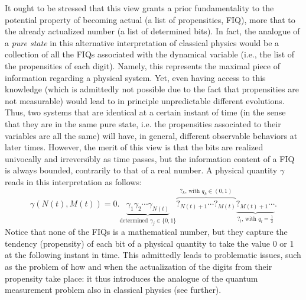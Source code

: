 \documentclass[aps,prl,twocolumn,showpacs,superscriptaddress,groupedaddress, nofootinbib]{revtex4-1}
\begin{document}
It ought to be stressed that this view grants a prior fundamentality to the potential property of becoming actual (a list of propensities, FIQ), more that to the already actualized number (a list of determined bits). {In fact, the analogue of a \emph{pure state} in this alternative interpretation of classical physics would be a collection of all the FIQs associated with the dynamical variable (i.e., the list of the propensities of each digit). Namely, this represents the maximal piece of information regarding a physical system. Yet, even having access to this knowledge (which is admittedly not possible due to the fact that propensities are not measurable) would lead to in principle unpredictable different evolutions. Thus, two systems that are identical at a certain instant of time (in the sense that they are in the same pure state, i.e. the propensities associated to their variables are all the same) will have, in general, different observable behaviors at later times.} However, the merit of this view is that the bits are realized univocally and irreversibly as time passes, but the information content of a FIQ is always bounded, contrarily to that of a real number. A physical quantity $\gamma$ reads in this interpretation as follows:
%
\begin{equation*}
\gamma \left(N(t), M(t)\right)=0.\underbrace{\gamma_1\gamma_2\cdots \gamma_{N(t)}}_{\textrm{determined }\gamma_j\in \{0, 1\}} \overbrace{?_{N(t)+1}\cdots ?_{M(t)}}^{?_k\textrm{, with } q_k\in(0, 1)}\underbrace{?_{M(t)+1}\cdots}_{?_l\textrm{, with } q_l=\frac{1}{2}}.
\end{equation*}
%
Notice that none of the FIQs is a mathematical number, but they capture the tendency (propensity) of each bit of a physical quantity to take the value 0 or 1 at the following instant in time. This admittedly leads to problematic issues, such as the problem of how and when the actualization of the digits from their propensity take place: it thus introduces the analogue of the quantum measurement problem also in classical physics (see further).
\end{document}

